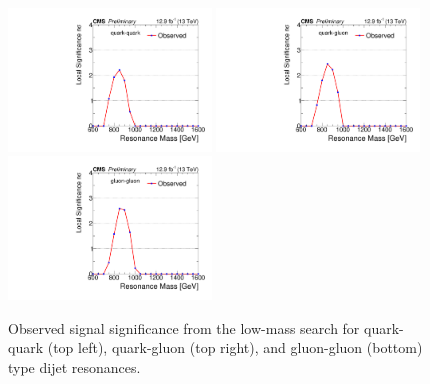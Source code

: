 \begin{figure}[hbtp]
  \centering
    \includegraphics[width=0.48\textwidth]{figs/dijet/signif_qq_calodijet2016.pdf}
    \includegraphics[width=0.48\textwidth]{figs/dijet/signif_qg_calodijet2016.pdf}
    \includegraphics[width=0.48\textwidth]{figs/dijet/signif_gg_calodijet2016.pdf}
    \caption{Observed signal significance from the low-mass search for
      quark-quark (top left), quark-gluon (top right), and gluon-gluon
      (bottom) type dijet resonances.}
    \label{figSignifLow}
\end{figure}

